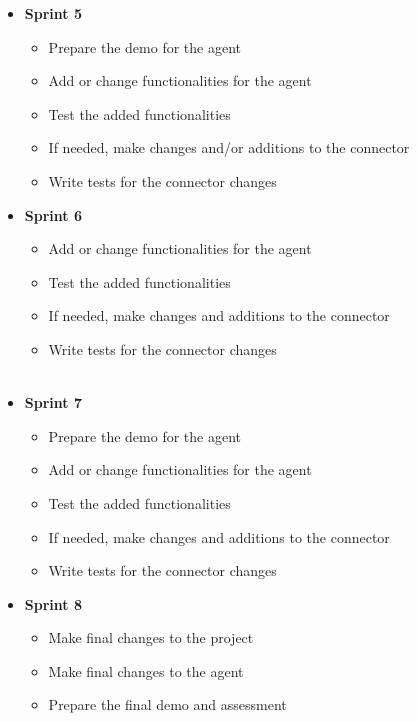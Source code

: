 \begin{itemize}
\item\textbf{Sprint 5}

\begin{itemize}
  \item Prepare the demo for the agent
  \item Add or change functionalities for the agent
  \item Test the added functionalities
  \item If needed, make changes and/or additions to the connector
  \item Write tests for the connector changes
\end{itemize}


\item\textbf{Sprint 6}

\begin{itemize}
  \item Add or change functionalities for the agent
  \item Test the added functionalities
  \item If needed, make changes and additions to the connector
  \item Write tests for the connector changes\\\\
\end{itemize}


\item\textbf{Sprint 7}

\begin{itemize}
  \item Prepare the demo for the agent
  \item Add or change functionalities for the agent
  \item Test the added functionalities
  \item If needed, make changes and additions to the connector
  \item Write tests for the connector changes
\end{itemize}

\item\textbf{Sprint 8}
\begin{itemize}
  \item Make final changes to the project
  \item Make final changes to the agent
  \item Prepare the final demo and assessment
\end{itemize}
\end{itemize}

